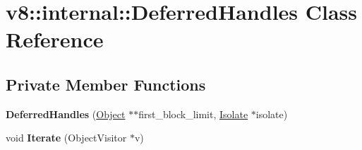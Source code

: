 \hypertarget{classv8_1_1internal_1_1_deferred_handles}{}\section{v8\+:\+:internal\+:\+:Deferred\+Handles Class Reference}
\label{classv8_1_1internal_1_1_deferred_handles}
\subsection*{Private Member Functions}
\begin{DoxyCompactItemize}
\item 
{\bfseries Deferred\+Handles} (\hyperlink{classv8_1_1internal_1_1_object}{Object} $\ast$$\ast$first\+\_\+block\+\_\+limit, \hyperlink{classv8_1_1internal_1_1_isolate}{Isolate} $\ast$isolate)\hypertarget{classv8_1_1internal_1_1_deferred_handles_a94a3e63b1ee87af78f02dcae0c8777ac}{}\label{classv8_1_1internal_1_1_deferred_handles_a94a3e63b1ee87af78f02dcae0c8777ac}

\item 
void {\bfseries Iterate} (Object\+Visitor $\ast$v)\hypertarget{classv8_1_1internal_1_1_deferred_handles_a751007ddf2754b313f28c55e47d96230}{}\label{classv8_1_1internal_1_1_deferred_handles_a751007ddf2754b313f28c55e47d96230}

\end{DoxyCompactItemize}

